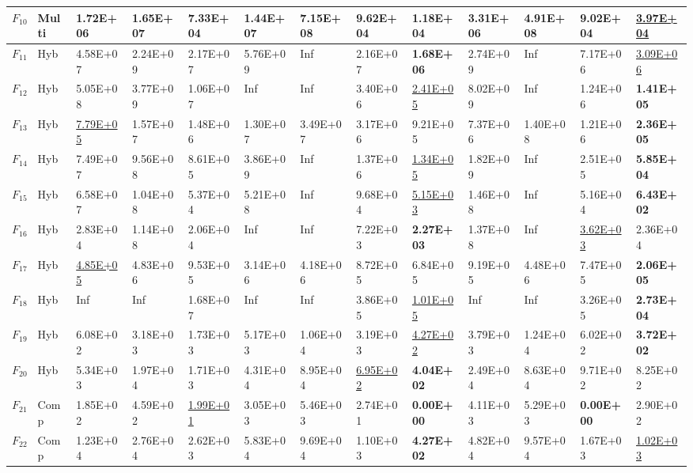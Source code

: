 \begin{table}
\begin{tabular}{cl*{10}{R{1.60cm}}R{1.70cm}}
$F_{10}$ & Multi & 1.72E+06 & 1.65E+07 & 7.33E+04 & 1.44E+07 & 7.15E+08 & 9.62E+04 & \textbf{1.18E+04} & 3.31E+06 & 4.91E+08 & 9.02E+04 & \underline{3.97E+04}\\
\midrule
$F_{11}$ & Hyb & 4.58E+07 & 2.24E+09 & 2.17E+07 & 5.76E+09 & Inf & 2.16E+07 & \textbf{1.68E+06} & 2.74E+09 & Inf & 7.17E+06 & \underline{3.09E+06}\\
$F_{12}$ & Hyb & 5.05E+08 & 3.77E+09 & 1.06E+07 & Inf & Inf & 3.40E+06 & \underline{2.41E+05} & 8.02E+09 & Inf & 1.24E+06 & \textbf{1.41E+05}\\
$F_{13}$ & Hyb & \underline{7.79E+05} & 1.57E+07 & 1.48E+06 & 1.30E+07 & 3.49E+07 & 3.17E+06 & 9.21E+05 & 7.37E+06 & 1.40E+08 & 1.21E+06 & \textbf{2.36E+05}\\
$F_{14}$ & Hyb & 7.49E+07 & 9.56E+08 & 8.61E+05 & 3.86E+09 & Inf & 1.37E+06 & \underline{1.34E+05} & 1.82E+09 & Inf & 2.51E+05 & \textbf{5.85E+04}\\
$F_{15}$ & Hyb & 6.58E+07 & 1.04E+08 & 5.37E+04 & 5.21E+08 & Inf & 9.68E+04 & \underline{5.15E+03} & 1.46E+08 & Inf & 5.16E+04 & \textbf{6.43E+02}\\
$F_{16}$ & Hyb & 2.83E+04 & 1.14E+08 & 2.06E+04 & Inf & Inf & 7.22E+03 & \textbf{2.27E+03} & 1.37E+08 & Inf & \underline{3.62E+03} & 2.36E+04\\
$F_{17}$ & Hyb & \underline{4.85E+05} & 4.83E+06 & 9.53E+05 & 3.14E+06 & 4.18E+06 & 8.72E+05 & 6.84E+05 & 9.19E+05 & 4.48E+06 & 7.47E+05 & \textbf{2.06E+05}\\
$F_{18}$ & Hyb & Inf & Inf & 1.68E+07 & Inf & Inf & 3.86E+05 & \underline{1.01E+05} & Inf & Inf & 3.26E+05 & \textbf{2.73E+04}\\
$F_{19}$ & Hyb & 6.08E+02 & 3.18E+03 & 1.73E+03 & 5.17E+03 & 1.06E+04 & 3.19E+03 & \underline{4.27E+02} & 3.79E+03 & 1.24E+04 & 6.02E+02 & \textbf{3.72E+02}\\
$F_{20}$ & Hyb & 5.34E+03 & 1.97E+04 & 1.71E+03 & 4.31E+04 & 8.95E+04 & \underline{6.95E+02} & \textbf{4.04E+02} & 2.49E+04 & 8.63E+04 & 9.71E+02 & 8.25E+02\\
\midrule
$F_{21}$ & Comp & 1.85E+02 & 4.59E+02 & \underline{1.99E+01} & 3.05E+03 & 5.46E+03 & 2.74E+01 & \textbf{0.00E+00} & 4.11E+03 & 5.29E+03 & \textbf{0.00E+00} & 2.90E+02\\
$F_{22}$ & Comp & 1.23E+04 & 2.76E+04 & 2.62E+03 & 5.83E+04 & 9.69E+04 & 1.10E+03 & \textbf{4.27E+02} & 4.82E+04 & 9.57E+04 & 1.67E+03 & \underline{1.02E+03}\\

\end{tabular}
\end{table}
